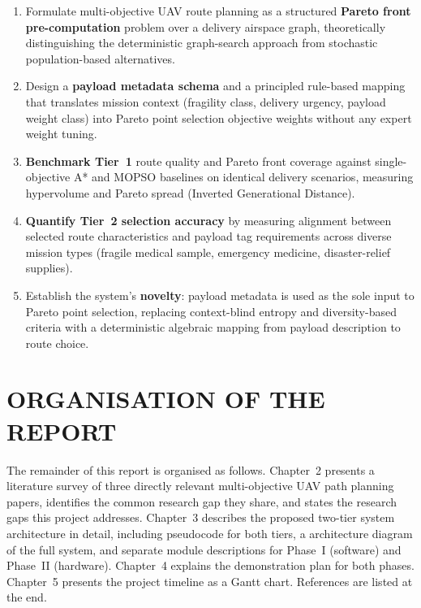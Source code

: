\begin{enumerate}
  \item Formulate multi-objective UAV route planning as a structured \textbf{Pareto front
        pre-computation} problem over a delivery airspace graph, theoretically
        distinguishing the deterministic graph-search approach from stochastic
        population-based alternatives.

  \item Design a \textbf{payload metadata schema} and a principled rule-based mapping
        that translates mission context (fragility class, delivery urgency, payload
        weight class) into Pareto point selection objective weights without any expert
        weight tuning.

  \item \textbf{Benchmark Tier~1} route quality and Pareto front coverage against
        single-objective A* and MOPSO baselines on identical delivery scenarios,
        measuring hypervolume and Pareto spread (Inverted Generational Distance).

  \item \textbf{Quantify Tier~2 selection accuracy} by measuring alignment between
        selected route characteristics and payload tag requirements across diverse
        mission types (fragile medical sample, emergency medicine, disaster-relief
        supplies).

  \item Establish the system's \textbf{novelty}: payload metadata is used as the sole
        input to Pareto point selection, replacing context-blind entropy and
        diversity-based criteria with a deterministic algebraic mapping from payload
        description to route choice.
\end{enumerate}

\section{ORGANISATION OF THE REPORT}

The remainder of this report is organised as follows. Chapter~2 presents a literature
survey of three directly relevant multi-objective UAV path planning papers, identifies
the common research gap they share, and states the research gaps this project addresses.
Chapter~3 describes the proposed two-tier system architecture in detail, including
pseudocode for both tiers, a architecture diagram of the full system, and separate
module descriptions for Phase~I (software) and Phase~II (hardware). Chapter~4 explains
the demonstration plan for both phases. Chapter~5 presents the project timeline as a
Gantt chart. References are listed at the end.